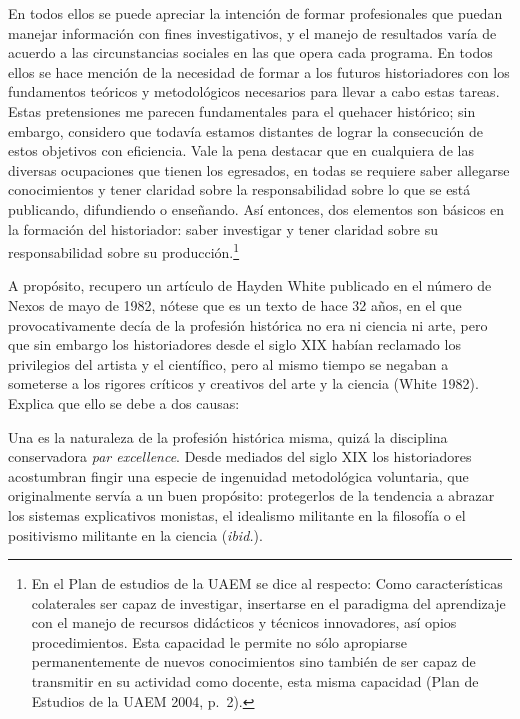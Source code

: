 En todos ellos se puede apreciar la intención de formar profesionales 
que puedan manejar información con fines investigativos, y el manejo de 
resultados varía de acuerdo a las circunstancias sociales en las que 
opera cada programa. En todos ellos se hace mención de la necesidad de 
formar a los futuros historiadores con los fundamentos teóricos y 
metodológicos necesarios para llevar a cabo estas tareas. Estas 
pretensiones me parecen fundamentales para el quehacer histórico; 
sin embargo, considero que todavía estamos distantes de lograr la 
consecución de estos objetivos con eficiencia. Vale la pena destacar 
que en cualquiera de las diversas ocupaciones que tienen los egresados, 
en todas se requiere saber allegarse conocimientos y tener claridad 
sobre la responsabilidad sobre lo que se está publicando, difundiendo o 
enseñando. Así entonces, dos elementos son básicos en la formación del 
historiador: saber investigar y tener claridad sobre su responsabilidad 
sobre su producción.\footnote{En el Plan de estudios de la UAEM se dice 
al respecto: Como características colaterales ser capaz de investigar, 
insertarse en el paradigma del aprendizaje con el manejo de recursos 
didácticos y técnicos innovadores, así opios procedimientos. Esta 
capacidad le permite no sólo apropiarse permanentemente de nuevos 
conocimientos sino también de ser capaz de transmitir en su actividad 
como docente, esta misma capacidad (Plan de Estudios de la UAEM 
2004, p.\ 2).} 

A propósito, recupero un artículo de Hayden White publicado en el 
número de Nexos de mayo de 1982, nótese que es un texto de hace 32 
años, en el que provocativamente decía de la profesión histórica no era 
ni ciencia ni arte, pero que sin embargo los historiadores desde el 
siglo XIX habían reclamado los privilegios del artista y el científico, 
pero al mismo tiempo se negaban a someterse a los rigores críticos y 
creativos del arte y la ciencia (White 1982). Explica que ello se debe a dos causas: 

Una es la naturaleza de la profesión histórica misma, quizá la 
disciplina conservadora  {\itshape par excellence}. Desde mediados del siglo XIX 
los historiadores acostumbran fingir una especie de ingenuidad 
metodológica voluntaria, que originalmente servía a un buen propósito: 
protegerlos de la tendencia a abrazar los sistemas explicativos 
monistas, el idealismo militante en la filosofía o el positivismo 
militante en la ciencia (\textit{ibid.}).

